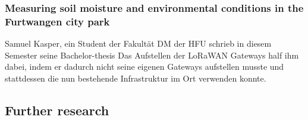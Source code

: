 \subsubsection{Measuring soil moisture and environmental conditions in the Furtwangen city park}

Samuel Kasper, ein Student der Fakultät \ac{DM} der \ac{HFU} schrieb in diesem Semester seine Bachelor-thesis
Das Aufstellen der \ac{LoRaWAN} Gateways half ihm dabei, indem er dadurch nicht seine eigenen Gateways aufstellen musste und stattdessen die nun bestehende Infrastruktur im Ort verwenden konnte.

\subsection{Further research}

